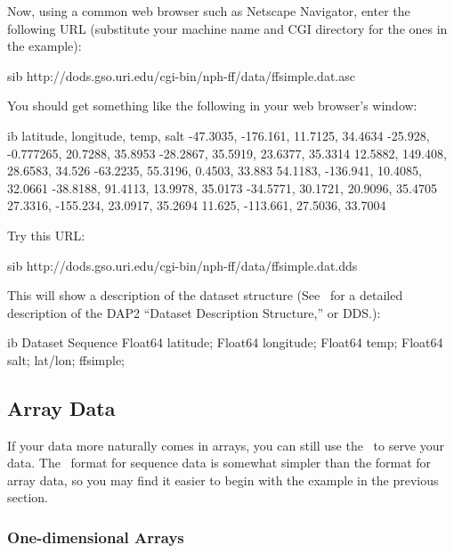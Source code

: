 Now, using a common web browser such as Netscape Navigator, enter the
following URL (substitute your machine name and CGI directory for the
ones in the example):

\begin{vcode}{sib}
http://dods.gso.uri.edu/cgi-bin/nph-ff/data/ffsimple.dat.asc
\end{vcode}

You should get something like the following in your web browser's
window:

\begin{vcode}{ib}
latitude, longitude, temp, salt
-47.3035, -176.161, 11.7125, 34.4634
-25.928, -0.777265, 20.7288, 35.8953
-28.2867, 35.5919, 23.6377, 35.3314
12.5882, 149.408, 28.6583, 34.526
-63.2235, 55.3196, 0.4503, 33.883
54.1183, -136.941, 10.4085, 32.0661
-38.8188, 91.4113, 13.9978, 35.0173
-34.5771, 30.1721, 20.9096, 35.4705
27.3316, -155.234, 23.0917, 35.2694
11.625, -113.661, 27.5036, 33.7004
\end{vcode}

Try this URL:

\begin{vcode}{sib}
http://dods.gso.uri.edu/cgi-bin/nph-ff/data/ffsimple.dat.dds
\end{vcode}

This will show a description of the dataset structure (See \DODSuser\ 
for a detailed description of the DAP2 ``Dataset Description
Structure,'' or DDS.):

\begin{vcode}{ib}
Dataset {
    Sequence {
        Float64 latitude;
        Float64 longitude;
        Float64 temp;
        Float64 salt;
    } lat/lon;
} ffsimple;
\end{vcode}

\subsection{Array Data}

If your data more naturally comes in arrays, you can still use the
\ffs\ to serve your data.  The \ffnd\ format for sequence data is
somewhat simpler than the format for array data, so you may find it
easier to begin with the example in the previous section.


\subsubsection{One-dimensional Arrays}

